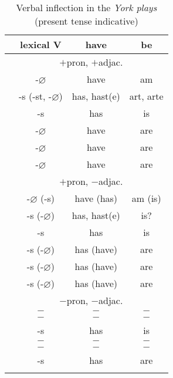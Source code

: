 \documentclass[output=paper]{langsci/langscibook}
\begin{document}
\begin{table}
   \begin{tabular}{lccc}
    \lsptoprule
    & lexical V & have & be\\\midrule
    & \multicolumn{3}{c}{$+$pron, $+$adjac.}\\
    \midrule
    \Fsg{} & -$\varnothing$ & have & am\\
    \Ssg{} & -s (-st, -$\varnothing$) & has, hast(e)  & art, arte\\
    \Tsg{} & -s & has & is\\
    \Fpl{} & -$\varnothing$ & have & are\\
    \Spl{} & -$\varnothing$ & have & are\\
    \Tpl{} & -$\varnothing$ & have & are\\
             \midrule
           & \multicolumn{3}{c}{$+$pron, $-$adjac.}\\\midrule
    \Fsg{} & -$\varnothing$ (-s) & have (has) & am (is)\\
    \Ssg{} & -s (-$\varnothing$) & has, hast(e) & is?  \\
    \Tsg{} & -s & has & is                             \\
    \Fpl{} & -s (-$\varnothing$) & has (have) & are    \\
    \Spl{} & -s (-$\varnothing$) & has (have) & are    \\
    \Tpl{} & -s (-$\varnothing$) & has (have) & are    \\
             \midrule
           & \multicolumn{3}{c}{$-$pron, $-$adjac.}\\\midrule
    \Fsg{} & $-$ & $-$ & $-$\\
    \Ssg{} & $-$ & $-$ & $-$\\
    \Tsg{} & -s & has & is\\
    \Fpl{} & $-$ & $-$ & $-$\\
    \Spl{} & $-$ & $-$ & $-$\\
    \Tpl{} & -s & has & are\\
   \lspbottomrule
   \end{tabular}
\caption{Verbal inflection in the \emph{York plays} (present tense
indicative)}\label{tab:trips:8}
\end{table}
\end{document}
